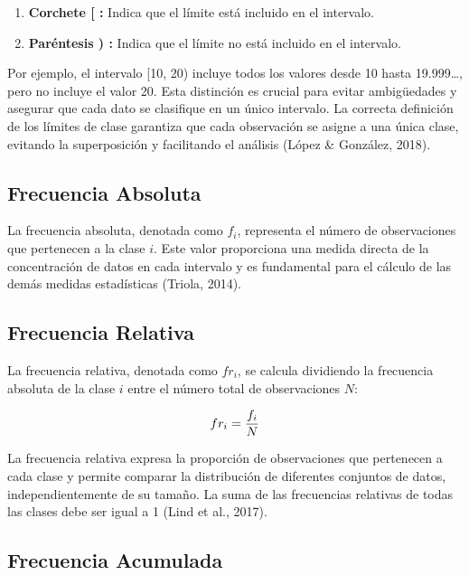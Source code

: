 \documentclass[
  spanish,
  letterpaper,
]{book}
\begin{document}
\begin{enumerate}
\def\labelenumi{\arabic{enumi}.}
\item
  \textbf{Corchete {[} :} Indica que el límite está incluido en el
  intervalo.
\item
  \textbf{Paréntesis ) :} Indica que el límite no está incluido en el
  intervalo.
\end{enumerate}

Por ejemplo, el intervalo {[}10, 20) incluye todos los valores desde 10
hasta 19.999\ldots, pero no incluye el valor 20. Esta distinción es
crucial para evitar ambigüedades y asegurar que cada dato se clasifique
en un único intervalo. La correcta definición de los límites de clase
garantiza que cada observación se asigne a una única clase, evitando la
superposición y facilitando el análisis (López \& González, 2018).

\subsection{Frecuencia Absoluta}\label{frecuencia-absoluta}

La frecuencia absoluta, denotada como \(f_i\)\hspace{0pt}, representa el
número de observaciones que pertenecen a la clase \(i\). Este valor
proporciona una medida directa de la concentración de datos en cada
intervalo y es fundamental para el cálculo de las demás medidas
estadísticas (Triola, 2014).

\subsection{Frecuencia Relativa}\label{frecuencia-relativa}

La frecuencia relativa, denotada como \(fr_i\)\hspace{0pt}, se calcula
dividiendo la frecuencia absoluta de la clase \(i\) entre el número
total de observaciones \(N\):

\[\huge fr_i = \frac{f_i}{N}\]

La frecuencia relativa expresa la proporción de observaciones que
pertenecen a cada clase y permite comparar la distribución de diferentes
conjuntos de datos, independientemente de su tamaño. La suma de las
frecuencias relativas de todas las clases debe ser igual a 1 (Lind et
al., 2017).

\subsection{Frecuencia Acumulada}\label{frecuencia-acumulada}
\end{document}
